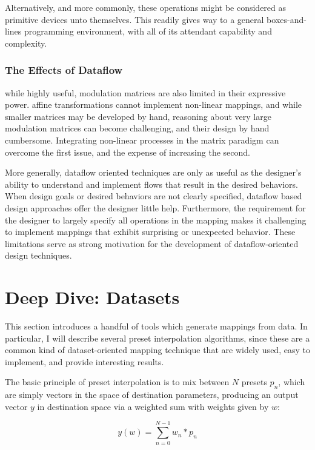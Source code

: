 \documentclass[main.tex]{subfiles}
\begin{document}
Alternatively, and more commonly, these operations might be considered as primitive devices unto themselves.
This readily gives way to a general boxes-and-lines programming environment, with all of its attendant
capability and complexity.

\subsubsection{The Effects of Dataflow}

while highly useful, modulation matrices are also limited in their expressive power.
affine transformations cannot implement non-linear mappings, and while smaller
matrices may be developed by hand, reasoning about very large modulation matrices
can become challenging, and their design by hand cumbersome. Integrating non-linear
processes in the matrix paradigm can overcome the first issue, and the expense of
increasing the second.

More generally, dataflow oriented techniques are only as useful as the
designer's ability to understand and implement flows that result in the desired
behaviors. When design goals or desired behaviors are not clearly specified,
dataflow based design approaches offer the designer little help. Furthermore,
the requirement for the designer to largely specify all operations in the
mapping makes it challenging to implement mappings that exhibit surprising or
unexpected behavior. These limitations serve as strong motivation for the
development of dataflow-oriented design techniques.

\section{Deep Dive: Datasets}

This section introduces a handful of tools which generate mappings from data. In particular,
I will describe several preset interpolation algorithms, since these are a common kind of
dataset-oriented mapping technique that are widely used, easy to implement, and provide
interesting results.

The basic principle of preset interpolation is to mix between
$N$ presets $p_n$, which are simply vectors in the space of destination parameters,
producing an output vector $y$ in destination
space via a weighted sum with weights given by $w$:

\begin{displaymath}
y(w) = \sum_{n = 0}^{N - 1} w_n * p_n
\end{displaymath}
\end{document}
